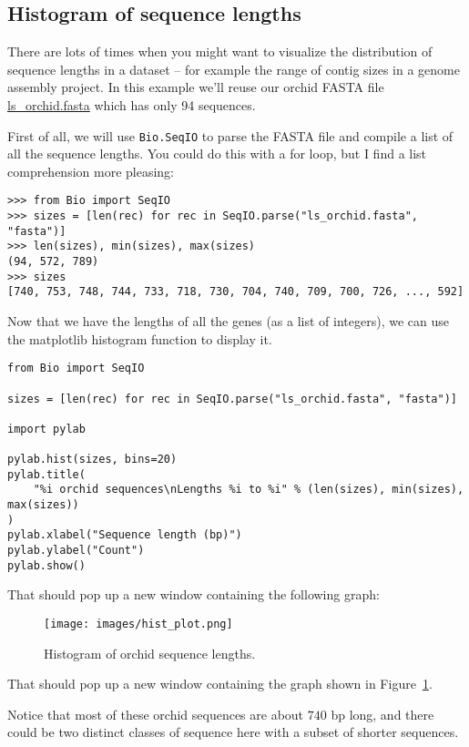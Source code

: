 \subsection{Histogram of sequence lengths}

There are lots of times when you might want to visualize the distribution of sequence
lengths in a dataset -- for example the range of contig sizes in a genome assembly
project.  In this example we'll reuse our orchid FASTA file
\href{https://raw.githubusercontent.com/biopython/biopython/master/Doc/examples/ls_orchid.fasta}{ls\_orchid.fasta}
which has only 94 sequences.

First of all, we will use \verb|Bio.SeqIO| to parse the FASTA file and compile a list
of all the sequence lengths.  You could do this with a for loop, but I find a list
comprehension more pleasing:

\begin{verbatim}
>>> from Bio import SeqIO
>>> sizes = [len(rec) for rec in SeqIO.parse("ls_orchid.fasta", "fasta")]
>>> len(sizes), min(sizes), max(sizes)
(94, 572, 789)
>>> sizes
[740, 753, 748, 744, 733, 718, 730, 704, 740, 709, 700, 726, ..., 592]
\end{verbatim}

Now that we have the lengths of all the genes (as a list of integers), we can use the
matplotlib histogram function to display it.

\begin{verbatim}
from Bio import SeqIO

sizes = [len(rec) for rec in SeqIO.parse("ls_orchid.fasta", "fasta")]

import pylab

pylab.hist(sizes, bins=20)
pylab.title(
    "%i orchid sequences\nLengths %i to %i" % (len(sizes), min(sizes), max(sizes))
)
pylab.xlabel("Sequence length (bp)")
pylab.ylabel("Count")
pylab.show()
\end{verbatim}

%
%
\begin{htmlonly}
\noindent That should pop up a new window containing the following graph:


\end{htmlonly}
%
%
\begin{latexonly}
\begin{figure}[htbp]
\centering
\texttt{[image: images/hist\_plot.png]}
\caption{Histogram of orchid sequence lengths.}
\label{fig:seq-len-hist}
\end{figure}
\noindent That should pop up a new window containing the graph
shown in Figure~\ref{fig:seq-len-hist}.
\end{latexonly}
%
%
Notice that most of these orchid sequences are about $740$ bp long, and there could be
two distinct classes of sequence here with a subset of shorter sequences.

